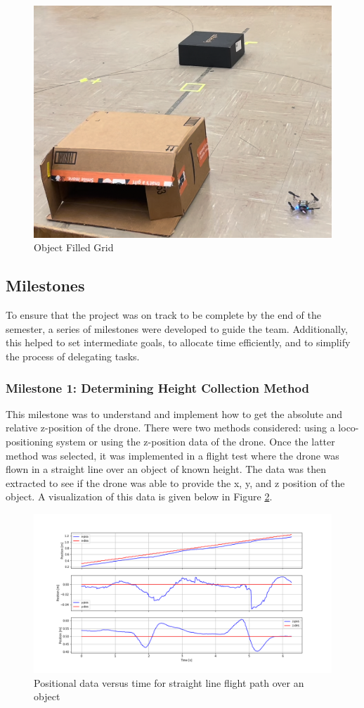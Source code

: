 \begin{figure}[H]
  \centering
  \includegraphics[width=0.5\linewidth]{Technical/OFG.png}  
  \caption{Object Filled Grid}
  \label{fig:OFG}
\end{figure}

\subsection{Milestones}
To ensure that the project was on track to be complete by the end of the semester, a series of milestones were developed to guide the team. Additionally, this helped to set intermediate goals, to allocate time efficiently, and to simplify the process of delegating tasks.

\subsubsection{Milestone 1: Determining Height Collection Method}
This milestone was to understand and implement how to get the absolute and relative z-position of the drone. There were two methods considered: using a loco-positioning system or using the z-position data of the drone. Once the latter method was selected, it was implemented in a flight test where the drone was flown in a straight line over an object of known height. The data was then extracted to see if the
drone was able to provide the x, y, and z position of the object. A visualization of this data is given below in Figure \ref{fig:m1}.

\begin{figure}[H]
  \centering
  \includegraphics[width=1.0\linewidth]{Technical/m1.png}  
  \caption{Positional data versus time for straight line flight path over an object}
  \label{fig:m1}
\end{figure}

